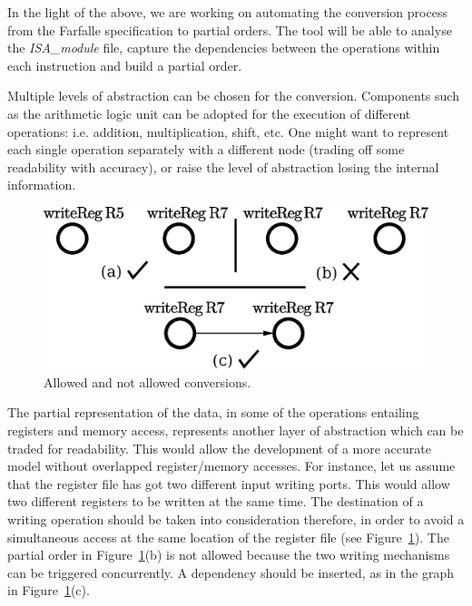 \documentclass[conference]{IEEEtran}
\begin{document}
In the light of the above, we are working on automating the conversion process from the
Farfalle specification to partial orders. The tool will be able to analyse the
\textit{ISA\_module} file, capture the dependencies between the operations within each
instruction and build a partial order. 

Multiple levels of abstraction can be chosen for the conversion. Components such as the
arithmetic logic unit can be adopted for the execution of
different operations: i.e. addition, multiplication, shift, etc. One might want to represent
each single operation separately with a different node 
(trading off some readability with accuracy), or raise the
level of abstraction losing the internal information.

\begin{figure}[ht!]
\begin{center}
	\includegraphics[width=\linewidth]{IMG/depPO.eps}
	\caption{Allowed and not allowed conversions.}
	\label{fig:depPO}
\end{center}
\end{figure}

The partial representation of the data, in some of the operations entailing registers and
memory access, represents another layer of abstraction which can be traded for readability.
This would allow the development of a more accurate model without overlapped register/memory
accesses. For instance, let us assume that the register file has got two different input
writing ports. This would allow two different registers to be written at the same time.
The destination of a writing operation should be taken into consideration therefore,
in order to avoid a simultaneous access at the same location of the register file
(see Figure~\ref{fig:depPO}). The partial order in Figure~\ref{fig:depPO}(b) is not allowed
because the two writing mechanisms can be triggered concurrently.
A dependency should be inserted, as in the graph in Figure~\ref{fig:depPO}(c).
\end{document}
